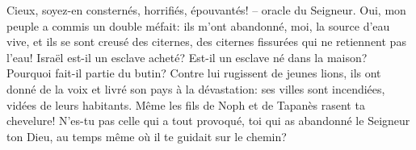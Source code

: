 Cieux, soyez-en consternés, horrifiés, épouvantés! – oracle du Seigneur.
Oui, mon peuple a commis un double méfait:
	ils m’ont abandonné, moi, la source d’eau vive,
	et ils se sont creusé des citernes,
		des citernes fissurées qui ne retiennent pas l’eau!
Israël est-il un esclave acheté?
	Est-il un esclave né dans la maison? Pourquoi fait-il partie du butin?
Contre lui rugissent de jeunes lions,
	ils ont donné de la voix et livré son pays à la dévastation:
	ses villes sont incendiées, vidées de leurs habitants.
Même les fils de Noph et de Tapanès rasent ta chevelure!
N’es-tu pas celle qui a tout provoqué,
	toi qui as abandonné le Seigneur ton Dieu,
	au temps même où il te guidait sur le chemin?
